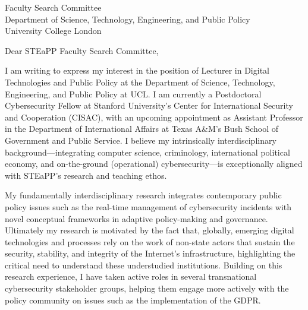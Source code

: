 \documentclass[11pt]{letter}
\begin{document}
\begin{letter}{ Faculty Search Committee \\
                Department of Science, Technology, Engineering, and
                Public Policy \\
                University College London                 
              }
\vspace{-1 \baselineskip}
\opening{Dear STEaPP Faculty Search Committee,}

I am writing to express my interest in the position of Lecturer in
Digital Technologies and Public Policy at the Department of Science,
Technology, Engineering, and Public Policy at UCL. 
%
I am currently a Postdoctoral Cybersecurity Fellow at Stanford
University's Center for International Security and Cooperation
(CISAC), with an upcoming appointment as Assistant Professor in the
Department of International Affairs at Texas A\&M's Bush School of
Government and Public Service. 
%
I believe my intrinsically interdisciplinary background---integrating computer science, criminology, international political economy, and on-the-ground (operational) cybersecurity---is exceptionally aligned with STEaPP’s research and teaching ethos.

My fundamentally interdisciplinary research integrates
contemporary public policy issues such as the real-time management of
cybersecurity incidents with novel conceptual frameworks in adaptive
policy-making and governance. 
%
Ultimately my research is motivated by the fact that, globally,
emerging digital technologies and processes rely on the work of non-state
actors that sustain the
security, stability, and integrity of the Internet's
infrastructure, highlighting the critical need to understand these
understudied institutions. 
%
Building on this research experience, I have taken active roles in
several transnational cybersecurity stakeholder groups, helping them
engage more actively with the policy community on issues such as the
implementation of the GDPR.



\end{letter}
\end{document}
